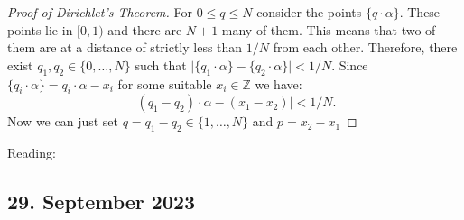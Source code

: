 \documentclass[a4paper,11pt,american]{article}
\newcommand{\Z}{\mathbb{Z}}
\theoremstyle{plain}
\theoremstyle{definition}
\begin{document}
  \begin{proof}[Proof of Dirichlet's Theorem] 
    For $0 \leq q \leq N$ consider the points $\{q \cdot\alpha\}$. These points lie in $[0,1)$ and there are $N+1$ many of them. This means that two of them are at a distance of strictly less than $1/N$ from each other. Therefore, there exist $q_1,q_2 \in \{0,\dots,N\}$ such that $\vert\{q_1 \cdot\alpha\} -\{q_2 \cdot \alpha\} \vert < 1/N$. Since $\{q_i \cdot\alpha\} = q_i \cdot\alpha - x_i$  for some suitable $x_i \in\Z$ we have:
    \begin{displaymath}
          \vert (q_1 -q_2)\cdot\alpha - (x_1-x_2) \vert < 1/N.
    \end{displaymath}
    Now we can just set $q= q_1-q_2 \in \{1,\dots,N\}$ and $p=x_2-x_1$
  \end{proof}
  
Reading: \cite{eisenbrand2012pope,WikiDirichlet}  


\subsection*{29. September 2023}
\end{document}
